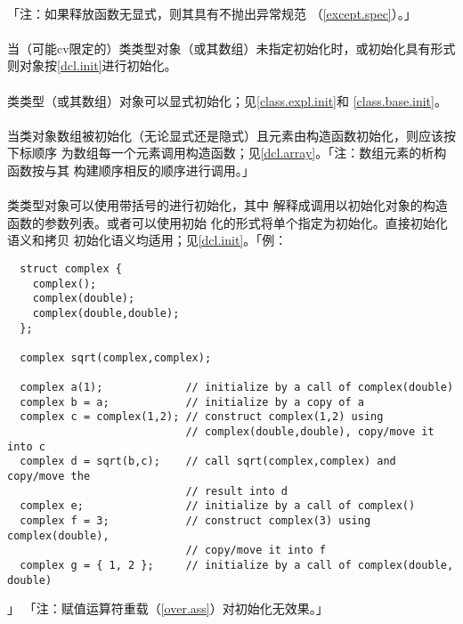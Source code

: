 \paragraph{}
「注：如果释放函数无显式，则其具有不抛出异常规范
（\ref{except.spec}）。」

\paragraph{}
当（可能cv限定的）类类型对象（或其数组）未指定初始化时，或初始化具有形式\tm{()}
则对象按\ref{dcl.init}进行初始化。

\paragraph{}
类类型（或其数组）对象可以显式初始化；见\ref{class.expl.init}和
\ref{class.base.init}。

\paragraph{}
当类对象数组被初始化（无论显式还是隐式）且元素由构造函数初始化，则应该按下标顺序
为数组每一个元素调用构造函数；见\ref{dcl.array}。「注：数组元素的析构函数按与其
构建顺序相反的顺序进行调用。」

\paragraph{}
类类型对象可以使用带括号的进行初始化，其中
解释成调用以初始化对象的构造函数的参数列表。或者可以使用初始
化的\tm{=}形式将单个指定为初始化。直接初始化语义和拷贝
初始化语义均适用；见\ref{dcl.init}。「例：
\begin{lstlisting}
  struct complex {
    complex();
    complex(double);
    complex(double,double);
  };

  complex sqrt(complex,complex);

  complex a(1);             // initialize by a call of complex(double)
  complex b = a;            // initialize by a copy of a
  complex c = complex(1,2); // construct complex(1,2) using
                            // complex(double,double), copy/move it into c
  complex d = sqrt(b,c);    // call sqrt(complex,complex) and copy/move the
                            // result into d
  complex e;                // initialize by a call of complex()
  complex f = 3;            // construct complex(3) using complex(double),
                            // copy/move it into f
  complex g = { 1, 2 };     // initialize by a call of complex(double, double)
\end{lstlisting}」
「注：赋值运算符重载（\ref{over.ass}）对初始化无效果。」

